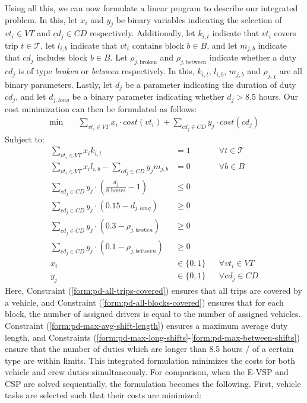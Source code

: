 \documentclass[]{article}
\begin{document}
\noindent Using all this, we can now formulate a linear program to describe our integrated problem. In this, let $x_i$ and $y_j$ be binary variables indicating the selection of $vt_i \in VT$ and $cd_j \in CD$ respectively. Additionally, let $k_{i,t}$ indicate that $vt_i$ covers trip $t \in \mathcal{T}$, let $l_{i,b}$ indicate that $vt_i$ contains block $b \in B$, and let $m_{j,b} $ indicate that $cd_j$ includes block $b \in B$. Let $\rho_{j,\text{broken}}$ and $\rho_{j,\text{between}}$ indicate whether a duty $cd_j$ is of type \textit{broken} or \textit{between} respectively. In this, $k_{i,t}$, $l_{i,b}$, $m_{j,b}$ and $\rho_{j,\chi}$  are all binary parameters. Lastly, let $d_j$ be a parameter indicating the duration of duty $cd_j$, and let $d_{j,\textit{long}}$ be a binary parameter indicating whether $d_j > 8.5$ hours. Our cost minimization can then be formulated as follows:
\begin{align}
\min \quad
& \sum_{vt_i \in VT} x_{i} \cdot cost(vt_i) + \sum_{cd_j \in CD} y_{j} \cdot cost(cd_j)  
\end{align}
Subject to:
\begin{align}
\sum_{vt_i \in VT} x_{i}k_{i,t} &= 1 && \forall t \in \mathcal{T} \label{form:pd-all-trips-covered} \\
\sum_{vt_i \in VT}x_i l_{i,b} - \sum_{cd_j \in CD}y_j m_{j,b} &= 0 && \forall b \in B \label{form:pd-all-blocks-covered} \\
\sum_{cd_j \in \textit{CD}} y_{j} \cdot (\frac{d_{j}}{\textit{8 hours}} - 1) &\leq 0 && \label{form:pd-max-avg-shift-length}\\
\sum_{cd_j \in \textit{CD}} y_{j} \cdot (0.15 - d_{j,\textit{long}}) &\geq 0 && \label{form:pd-max-long-shifts}\\
\sum_{cd_j \in \textit{CD}} y_{j} \cdot (0.3 - \rho_{j,\textit{broken}}) &\geq 0 && \label{form:pd-max-broken-shifts}\\
\sum_{cd_j \in \textit{CD}} y_{j} \cdot (0.1 - \rho_{j,\textit{between}}) &\geq 0 && \label{form:pd-max-between-shifts}\\
x_{i} &\in \{ 0, 1 \} && \forall vt_i \in VT \\
y_{j} &\in \{ 0, 1 \} && \forall cd_j \in CD
\end{align}
Here, Constraint (\ref{form:pd-all-trips-covered}) ensures that all trips are covered by a vehicle, and Constraint (\ref{form:pd-all-blocks-covered}) ensures that for each block, the number of assigned drivers is equal to the number of assigned vehicles. Constraint (\ref{form:pd-max-avg-shift-length}) ensures a maximum average duty length, and Constraints (\ref{form:pd-max-long-shifts}-\ref{form:pd-max-between-shifts}) ensure that the number of duties which are longer than 8.5 hours / of a certain type are within limits. This integrated formulation minimizes the costs for both vehicle and crew duties simultaneously. For comparison, when the E-VSP and CSP are solved sequentially, the formulation becomes the following. First, vehicle tasks are selected such that their costs are minimized:
\end{document}
